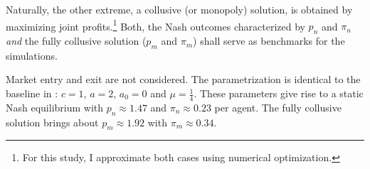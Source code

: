 Naturally, the other extreme, a collusive (or monopoly) solution, is obtained by maximizing joint profits.\footnote{For this study, I approximate both cases using numerical optimization.} Both, the Nash outcomes characterized by $p_n$ and $\pi_n$ \emph{and} the fully collusive solution ($p_m$ and $\pi_m$) shall serve as benchmarks for the simulations.

Market entry and exit are not considered. The parametrization is identical to the baseline in \textcite[p. 3274]{calvano_artificial_2020}:
$c = 1$,
$a = 2$,
$a_0 = 0$ and
$\mu = \frac{1}{4}$. These parameters give rise to a static Nash equilibrium with $p_n \approx 1.47$ and $\pi_n \approx 0.23$ per agent. The fully collusive solution brings about $p_m \approx 1.92$ with $\pi_m \approx 0.34$.